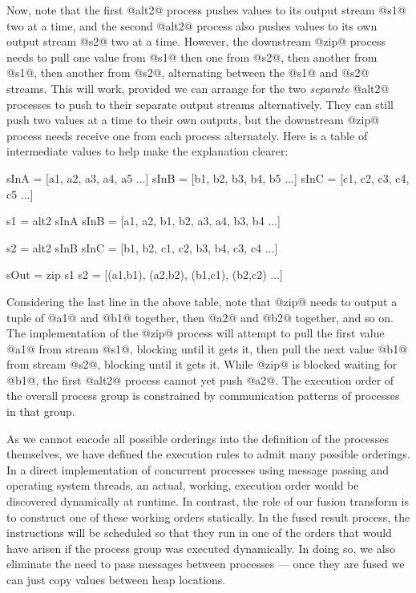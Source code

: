 Now, note that the first @alt2@ process pushes values to its output stream @s1@ two at a time, and the second @alt2@ process also pushes values to its own output stream @s2@ two at a time. However, the downstream @zip@ process needs to pull one value from @s1@ then one from @s2@, then another from @s1@, then another from @s2@, alternating between the @s1@ and @s2@ streams. This will work, provided we can arrange for the two \emph{separate} @alt2@ processes to push to their separate output streams alternatively. They can still push two values at a time to their own outputs, but the downstream @zip@ process needs receive one from each process alternately. Here is a table of intermediate values to help make the explanation clearer:

\begin{code}
    sInA = [a1, a2, a3, a4, a5 ...]
    sInB = [b1, b2, b3, b4, b5 ...]
    sInC = [c1, c2, c3, c4, c5 ...]

    s1   = alt2 sInA sInB 
         = [a1, a2, b1, b2, a3, a4, b3, b4 ...]

    s2   = alt2 sInB sInC
         = [b1, b2, c1, c2, b3, b4, c3, c4 ...]

    sOut = zip s1 s2
         = [(a1,b1), (a2,b2), (b1,c1), (b2,c2) ...]
\end{code}

Considering the last line in the above table, note that @zip@ needs to output a tuple of @a1@ and @b1@ together, then @a2@ and @b2@ together, and so on. The implementation of the @zip@ process will attempt to pull the first value @a1@ from stream @s1@, blocking until it gets it, then pull the next value @b1@ from stream @s2@, blocking until it gets it. While @zip@ is blocked waiting for @b1@, the first @alt2@ process cannot yet push @a2@. The execution order of the overall process group is constrained by communication patterns of processes in that group.

As we cannot encode all possible orderings into the definition of the processes themselves, we have defined the execution rules to admit many possible orderings. In a direct implementation of concurrent processes using message passing and operating system threads, an actual, working, execution order would be discovered dynamically at runtime. In contrast, the role of our fusion transform is to construct one of these working orders statically. In the fused result process, the instructions will be scheduled so that they run in one of the orders that would have arisen if the process group was executed dynamically. In doing so, we also eliminate the need to pass messages between processes --- once they are fused we can just copy values between heap locations.


